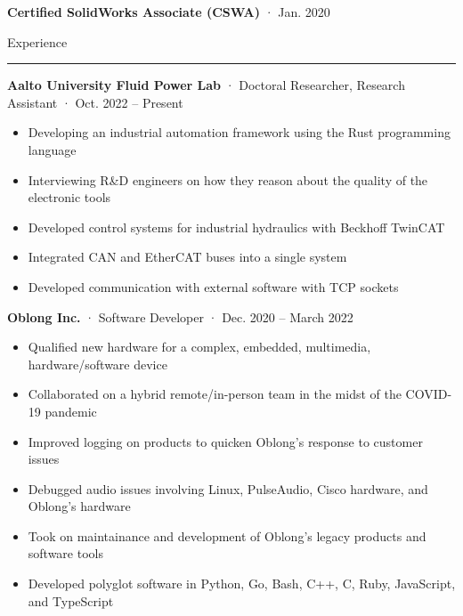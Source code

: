 \documentclass[12pt, oneside]{article}
\newcommand{\headingstyleJobs}[1] {
	{\fontsize{18pt}{1em}\selectfont \textcolor{new_red}{\textsf{#1}}}
	\textcolor{new_red}{\rule{3.25in}{0.5pt}} \vspace{3pt}
}
\newcommand{\jobtitle}[3] {
	{\bf #1} · {#2} · {#3} \vspace{-7pt} \\
}
\newcommand{\certification}[2] {
	{\bf #1} · {#2}
}
\begin{document}
\begin{flushleft}
\certification{Certified SolidWorks Associate (CSWA)}{Jan. 2020} \vspace{5pt}


\headingstyleJobs{Experience}

\jobtitle{Aalto University Fluid Power Lab}{Doctoral Researcher, Research Assistant}{Oct. 2022 – Present}
\begin{itemize}
  \item Developing an industrial automation framework using the Rust programming language \\
  \item Interviewing R\&D engineers on how they reason about the quality of the electronic tools \\
  \item Developed control systems for industrial hydraulics with Beckhoff TwinCAT \\
  \item Integrated CAN and EtherCAT buses into a single system \\
  \item Developed communication with external software with TCP sockets \\
\end{itemize}

\jobtitle{Oblong Inc.}{Software Developer}{Dec. 2020 – March 2022}
\begin{itemize}
	\item Qualified new hardware for a complex, embedded, multimedia, hardware/software device \\
	\item Collaborated on a hybrid remote/in-person team in the midst of the COVID-19 pandemic \\
	\item Improved logging on products to quicken Oblong's response to customer issues \\
	\item Debugged audio issues involving Linux, PulseAudio, Cisco hardware, and Oblong's hardware \\
	\item Took on maintainance and development of Oblong's legacy products and  software tools \\
	\item Developed polyglot software in Python, Go, Bash, C++, C, Ruby, JavaScript, and TypeScript \\
\end{itemize}


\end{flushleft}
\end{document}
